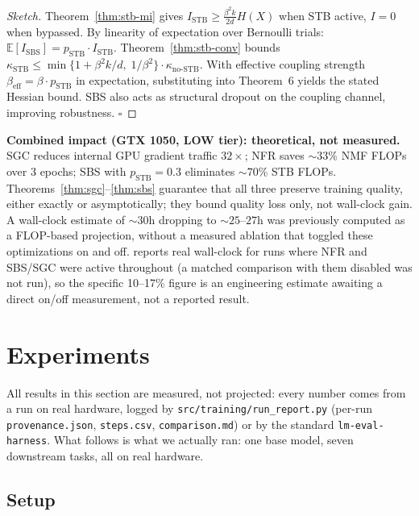 \documentclass{scpe}
\begin{document}
\begin{proof}[Sketch]
Theorem~\ref{thm:stb-mi} gives $I_{\text{STB}} \geq \frac{\beta^2 k}{2d} H(X)$ when STB active, $I=0$ when bypassed. By linearity of expectation over Bernoulli trials: $\mathbb{E}[I_{\text{SBS}}] = p_{\text{STB}} \cdot I_{\text{STB}}$. Theorem~\ref{thm:stb-conv} bounds $\kappa_{\text{STB}} \leq \min\{1+\beta^2 k/d,\; 1/\beta^2\} \cdot \kappa_{\text{no-STB}}$. With effective coupling strength $\beta_{\text{eff}} = \beta \cdot p_{\text{STB}}$ in expectation, substituting into Theorem~6 yields the stated Hessian bound. SBS also acts as structural dropout on the coupling channel, improving robustness. $\square$
\end{proof}

\textbf{Combined impact (GTX 1050, LOW tier): theoretical, not measured.} SGC reduces internal GPU gradient traffic $32\times$; NFR saves $\sim 33\%$ NMF FLOPs over 3 epochs; SBS with $p_{\text{STB}}=0.3$ eliminates $\sim 70\%$ STB FLOPs. Theorems~\ref{thm:sgc}--\ref{thm:sbs} guarantee that all three preserve training quality, either exactly or asymptotically; they bound quality loss only, not wall-clock gain. A wall-clock estimate of $\sim 30$h dropping to $\sim 25$--$27$h was previously computed as a FLOP-based projection, without a measured ablation that toggled these optimizations on and off.  reports real wall-clock for runs where NFR and SBS/SGC were active throughout (a matched comparison with them disabled was not run), so the specific 10--17\% figure is an engineering estimate awaiting a direct on/off measurement, not a reported result.

\section{Experiments}
\label{sec:experiments}

All results in this section are measured, not projected: every number comes from a run on real hardware, logged by \texttt{src/training/run\_report.py} (per-run \texttt{provenance.json}, \texttt{steps.csv}, \texttt{comparison.md}) or by the standard \texttt{lm-eval-harness}. What follows is what we actually ran: one base model, seven downstream tasks, all on real hardware.

\subsection{Setup}
\end{document}

